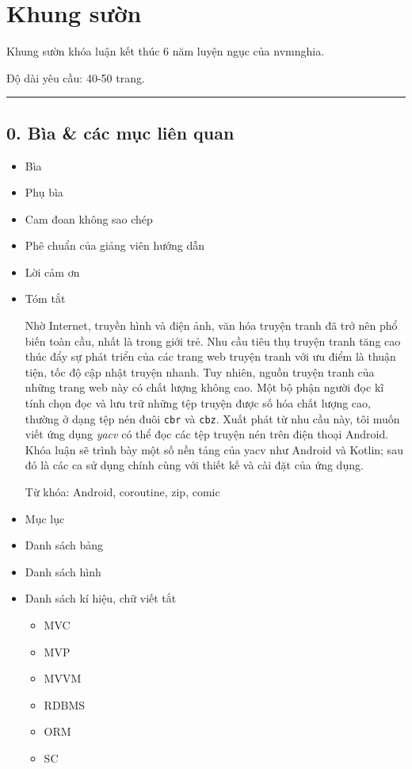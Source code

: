 \documentclass[
]{article}
\author{}
\date{}
\begin{document}
\hypertarget{khung-sux1b0ux1eddn}{%
\section{Khung sườn}\label{khung-sux1b0ux1eddn}}

Khung sườn khóa luận kết thúc 6 năm luyện ngục của nvmnghia.

Độ dài yêu cầu: 40-50 trang.

\begin{center}\rule{0.5\linewidth}{0.5pt}\end{center}

\hypertarget{buxeca-cuxe1c-mux1ee5c-liuxean-quan}{%
\subsection{0. Bìa \& các mục liên
quan}\label{buxeca-cuxe1c-mux1ee5c-liuxean-quan}}

\begin{itemize}
\item
  Bìa
\item
  Phụ bìa
\item
  Cam đoan không sao chép
\item
  Phê chuẩn của giảng viên hướng dẫn
\item
  Lời cảm ơn
\item
  Tóm tắt

  Nhờ Internet, truyền hình và điện ảnh, văn hóa truyện tranh đã trở nên
  phổ biến toàn cầu, nhất là trong giới trẻ. Nhu cầu tiêu thụ truyện
  tranh tăng cao thúc đẩy sự phát triển của các trang web truyện tranh
  với ưu điểm là thuận tiện, tốc độ cập nhật truyện nhanh. Tuy nhiên,
  nguồn truyện tranh của những trang web này có chất lượng không cao.
  Một bộ phận người đọc kĩ tính chọn đọc và lưu trữ những tệp truyện
  được số hóa chất lượng cao, thường ở dạng tệp nén đuôi \texttt{cbr} và
  \texttt{cbz}. Xuất phát từ nhu cầu này, tôi muốn viết ứng dụng
  \emph{yacv} có thể đọc các tệp truyện nén trên điện thoại Android.
  Khóa luận sẽ trình bày một số nền tảng của yacv như Android và Kotlin;
  sau đó là các ca sử dụng chính cùng với thiết kế và cài đặt của ứng
  dụng.

  Từ khóa: Android, coroutine, zip, comic
\item
  Mục lục
\item
  Danh sách bảng
\item
  Danh sách hình
\item
  Danh sách kí hiệu, chữ viết tắt

  \begin{itemize}
    \item
    MVC
  \item
    MVP
  \item
    MVVM
  \item
    RDBMS
  \item
    ORM
  \item
    SC
  \end{itemize}
\end{itemize}
\end{document}

